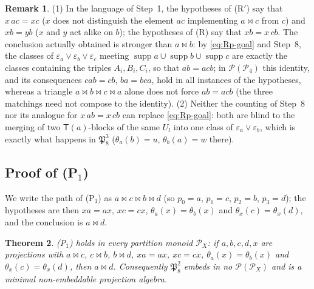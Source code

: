\documentclass[11pt]{amsart}
\newtheorem{theorem}{Theorem}[section]
\theoremstyle{definition}
\newtheorem{remark}[theorem]{Remark}
\renewcommand{\P}{\mathcal{P}}
\newcommand{\supp}{\operatorname{supp}}
\newcommand{\T}{\mathsf{T}}
\begin{document}
\begin{remark}\label{rem:Rp}
(1) In the language of Step~1, the hypotheses of (R$'$) say that $x\,ac=xc$ ($x$ does not distinguish the element $ac$ implementing $a\bowtie c$ from $c$) and $xb=yb$ ($x$ and $y$ act alike on $b$); the hypotheses of (R) say that $xb=x\,cb$. The conclusion actually obtained is stronger than $a\bowtie b$: by \eqref{eq:Rp-goal} and Step~8, the classes of $\varepsilon_a\vee\varepsilon_b\vee\varepsilon_c$ meeting $\supp a\cup\supp b\cup\supp c$ are exactly the classes containing the triples $A_i,B_i,C_i$, so that $ab=acb$; in $\P(\P_4)$ this identity, and its consequences $cab=cb$, $ba=bca$, hold in all instances of the hypotheses, whereas a triangle $a\bowtie b\bowtie c\bowtie a$ alone does not force $ab=acb$ (the three matchings need not compose to the identity). (2) Neither the counting of Step~8 nor its analogue for $x\,ab=x\,cb$ can replace \eqref{eq:Rp-goal}: both are blind to the merging of two $\T(a)$-blocks of the same $U_l$ into one class of $\varepsilon_a\vee\varepsilon_b$, which is exactly what happens in $\mathfrak P_8^3$ ($\theta_a(b)=u$, $\theta_b(a)=w$ there).
\end{remark}

\subsection{Proof of (P$_1$)}\label{subsec:P1}

We write the path of (P$_1$) as $a\bowtie c\bowtie b\bowtie d$ (so $p_0=a$, $p_1=c$, $p_2=b$, $p_3=d$); the hypotheses are then $xa=ax$, $xc=cx$, $\theta_a(x)=\theta_b(x)$ and $\theta_x(c)=\theta_x(d)$, and the conclusion is $a\bowtie d$.

\begin{theorem}\label{thm:P1}
(P$_1$) holds in every partition monoid $\P_X$: if $a,b,c,d,x$ are projections with $a\bowtie c$, $c\bowtie b$, $b\bowtie d$, $xa=ax$, $xc=cx$, $\theta_a(x)=\theta_b(x)$ and $\theta_x(c)=\theta_x(d)$, then $a\bowtie d$. Consequently $\mathfrak P_8^2$ embeds in no $\P(\P_X)$ and is a minimal non-embeddable projection algebra.
\end{theorem}
\end{document}
